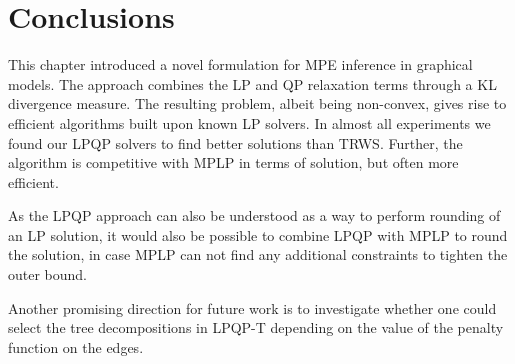 \section{Conclusions}

This chapter introduced a novel formulation for \ac{MPE} inference in
graphical models. The approach combines the \ac{LP} and \ac{QP} relaxation
terms through a \ac{KL} divergence measure.
The resulting problem, albeit being non-convex, gives rise to efficient 
algorithms built upon known \ac{LP} solvers.
In almost all experiments we found our \ac{LPQP} solvers to find better
solutions than \ac{TRWS}. Further, the algorithm is competitive with \ac{MPLP}
in terms of solution, but often more efficient.

As the \ac{LPQP} approach can also be understood as a way to perform rounding
of an \ac{LP} solution, it would also be possible to combine \ac{LPQP} with
\ac{MPLP} to round the solution, in case \ac{MPLP} can not find any additional
constraints to tighten the outer bound.

Another promising direction for future work is to investigate whether one could select the
tree decompositions in \acs{LPQP-T} depending on the value of the penalty function on the
edges.
